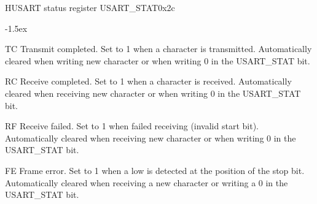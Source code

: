 \documentclass[12pt]{article}
\begin{document}
\begin{register}{H}{USART status register USART\_STAT}{0x2c}
\label{usartstat}
%
%
%
%
%
%
\regnewline%
\end{register}
\begin{regdesc}[0.8\textwidth]\begin{reglist}[0000]
\itemsep-1.5ex
\item[TC] Transmit completed. Set to 1 when a character is transmitted. Automatically cleared when writing new character or when writing 0 in the USART\_STAT bit.
\item[RC] Receive completed. Set to 1 when a character is received. Automatically cleared when receiving new character or when writing 0 in the USART\_STAT bit.
\item[RF] Receive failed. Set to 1 when failed receiving (invalid start bit). Automatically cleared when receiving new character or when writing 0 in the USART\_STAT bit.
\item [FE] Frame error. Set to 1 when a low is detected at the position of the stop bit. Automatically cleared when receiving a new character or writing a 0 in the USART\_STAT bit.
\end{reglist}\end{regdesc}

%

%
\end{document}
